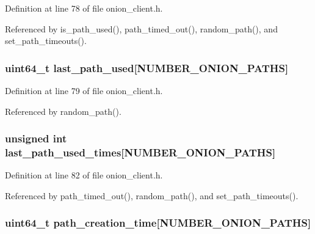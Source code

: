 Definition at line 78 of file onion\+\_\+client.\+h.



Referenced by is\+\_\+path\+\_\+used(), path\+\_\+timed\+\_\+out(), random\+\_\+path(), and set\+\_\+path\+\_\+timeouts().

\hypertarget{struct_onion___client___paths_a3e3d1429ce10f2adad7b1c02df8f5417}{
\subsubsection[{last\+\_\+path\+\_\+used}]{\setlength{\rightskip}{0pt plus 5cm}uint64\+\_\+t last\+\_\+path\+\_\+used\mbox{[}{\bf N\+U\+M\+B\+E\+R\+\_\+\+O\+N\+I\+O\+N\+\_\+\+P\+A\+T\+H\+S}\mbox{]}}}\label{struct_onion___client___paths_a3e3d1429ce10f2adad7b1c02df8f5417}


Definition at line 79 of file onion\+\_\+client.\+h.



Referenced by random\+\_\+path().

\hypertarget{struct_onion___client___paths_a3a947792d864563f1c4d6984cc9c638a}{
\subsubsection[{last\+\_\+path\+\_\+used\+\_\+times}]{\setlength{\rightskip}{0pt plus 5cm}unsigned int last\+\_\+path\+\_\+used\+\_\+times\mbox{[}{\bf N\+U\+M\+B\+E\+R\+\_\+\+O\+N\+I\+O\+N\+\_\+\+P\+A\+T\+H\+S}\mbox{]}}}\label{struct_onion___client___paths_a3a947792d864563f1c4d6984cc9c638a}


Definition at line 82 of file onion\+\_\+client.\+h.



Referenced by path\+\_\+timed\+\_\+out(), random\+\_\+path(), and set\+\_\+path\+\_\+timeouts().

\hypertarget{struct_onion___client___paths_abc272861ece76f9d9bac356f7297ce3e}{
\subsubsection[{path\+\_\+creation\+\_\+time}]{\setlength{\rightskip}{0pt plus 5cm}uint64\+\_\+t path\+\_\+creation\+\_\+time\mbox{[}{\bf N\+U\+M\+B\+E\+R\+\_\+\+O\+N\+I\+O\+N\+\_\+\+P\+A\+T\+H\+S}\mbox{]}}}\label{struct_onion___client___paths_abc272861ece76f9d9bac356f7297ce3e}


